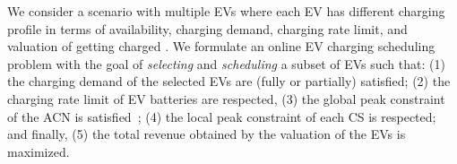 

We consider a scenario with multiple EVs where each EV has different charging profile in terms of availability, charging demand, charging rate limit, and valuation of getting charged . We formulate an online EV charging scheduling problem with the goal of \textit{selecting} and \textit{scheduling} a subset of EVs such that: (1) the charging demand of the selected EVs are (fully or partially) satisfied; (2) the charging rate limit of EV batteries are respected, (3) the global peak constraint of the ACN is satisfied~\cite{lee2018adaptive}; (4) the local peak constraint of each CS is respected;  and finally, (5) the total revenue obtained by the valuation of the EVs is maximized. 




